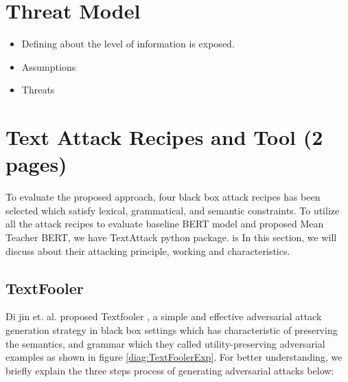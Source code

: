 \documentclass[%
	BCOR=8mm, %
	DIV=12, 
	toc=bibliography, %
	toc=listof, %
	oneside, %
	egregdoesnotlikesansseriftitles, %
	]{scrbook}
\begin{document}
\section{Threat Model}

\begin{itemize}
\item Defining about the level of information is exposed. 
\item Assumptions
\item Threats
\end{itemize}


\section{Text Attack Recipes and Tool (2 pages)}

To evaluate the proposed approach, four black box attack recipes has been selected which satisfy lexical, grammatical, and semantic constraints. To utilize all the attack recipes 
to evaluate baseline BERT model and proposed Mean Teacher BERT, we have TextAttack python package\cite{morris_textattack_2020}. is  In this section, we will discuss about
 their attacking principle, working and characteristics. 
 
\subsection{TextFooler}

Di jin et$.$ al$.$ proposed Textfooler \cite{jia_certified_2019}, a simple and effective adversarial attack generation strategy in black box settings which has characteristic 
of preserving the semantics, and grammar which they called utility-preserving adversarial examples as shown in figure \ref{diag:TextFoolerExp}. For better understanding,
 we briefly explain the three steps process of generating adversarial attacks below:
 
\end{document}
